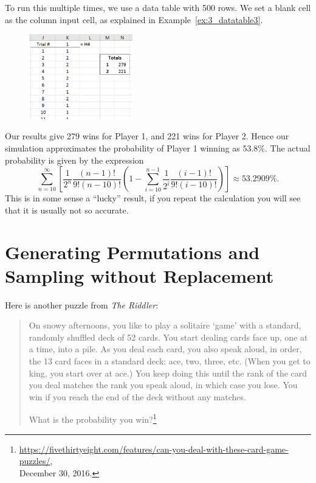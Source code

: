 To run this multiple times, we use a data table with 500 rows. 
We set a blank cell as the column input cell, as explained in Example~\ref{ex:3_datatable3}.

\begin{figure}[htbp]
	\centering
	\includegraphics[width=0.4\textwidth]{fig/3_couch_3.png}
	\label{fig:3_couch_3}
\end{figure}

Our results give 279 wins for Player 1, and 221 wins for Player 2.
Hence our simulation approximates the probability of Player 1 winning as $53.8\%$.
The actual probability is given by the expression \[ \sum_{n = 10}^\infty \left[\frac{1}{2^n}\frac{(n-1)!}{9!(n-10)!}  \left( 1 - \sum_{i=10}^{n-1} \frac{1}{2^i}\frac{(i-1)!}{9!(i-10)!}\right) \right] \approx 53.2909\%. \]
This is in some sense a ``lucky'' result, if you repeat the calculation you will see that it is usually not so accurate.

\section{Generating Permutations and Sampling without Replacement}

Here is another puzzle from \emph{The Riddler}:

\begin{quote}
On snowy afternoons, you like to play a solitaire `game' with a standard, randomly shuffled deck of 52 cards.
You start dealing cards face up, one at a time, into a pile.
As you deal each card, you also speak aloud, in order, the 13 card faces in a standard deck: ace, two, three, etc.
(When you get to king, you start over at ace.)
You keep doing this until the rank of the card you deal matches the rank you speak aloud, in which case you lose.
You win if you reach the end of the deck without any matches.

What is the probability you win?\footnote{\url{https://fivethirtyeight.com/features/can-you-deal-with-these-card-game-puzzles/}, \\ December 30, 2016.}
\end{quote}

